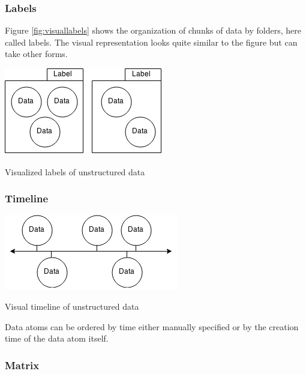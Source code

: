 \subsubsection{Labels}

Figure \ref{fig:visuallabels} shows the organization of chunks of data by
folders, here called labels. The visual representation looks quite similar to
the figure but can take other forms.

\begin{flfigure}
  \centering
    \includegraphics[width=0.5\linewidth]{00_resources/data_labels.png}
    \caption{Visualized labels of unstructured data}
  \label{fig:visuallabels}
\end{flfigure}

\subsubsection{Timeline}

\begin{flfigure}
  \centering
    \includegraphics[width=0.5\linewidth]{00_resources/data_timeline.png}
    \caption{Visual timeline of unstructured data}
  \label{fig:visualtimeline}
\end{flfigure}

Data atoms can be ordered by time either manually specified or by the creation time of the data atom itself.

\subsubsection{Matrix}

